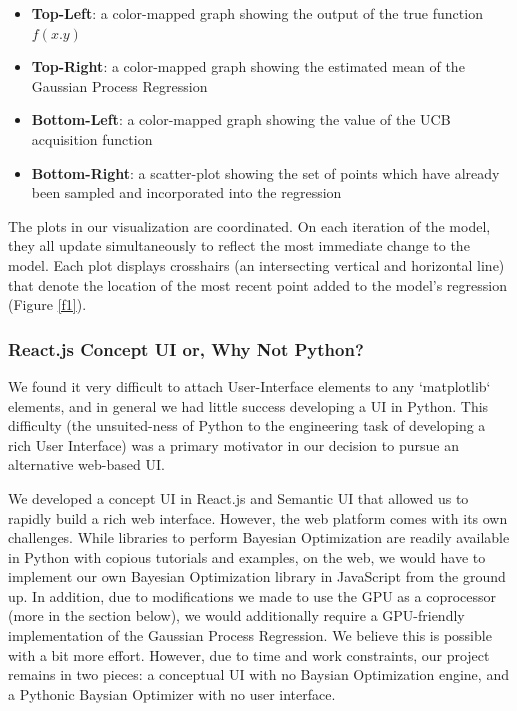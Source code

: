 \documentclass{vgtc}                          %
\begin{document}
\begin{itemize}

	\item \textbf{Top-Left}: a color-mapped graph showing the output of the
		true function $f(x.y)$

	\item \textbf{Top-Right}: a color-mapped graph showing the estimated
		mean of the Gaussian Process Regression

	\item \textbf{Bottom-Left}: a color-mapped graph showing the value of
		the UCB acquisition function
	
	\item \textbf{Bottom-Right}: a scatter-plot showing the set of points
		which have already been sampled and incorporated into the
		regression

\end{itemize}

The plots in our visualization are coordinated. On each iteration of the model,
they all update simultaneously to reflect the most immediate change to the
model. Each plot displays crosshairs (an intersecting vertical and horizontal
line) that denote the location of the most recent point added to the model's
regression (Figure \ref{f1}).

\subsubsection{React.js Concept UI or, Why Not Python?}

We found it very difficult to attach User-Interface elements to any
`matplotlib` elements, and in general we had little success developing a UI in
Python. This difficulty (the unsuited-ness of Python to the engineering task
of developing a rich User Interface) was a primary motivator in our decision to
pursue an alternative web-based UI. 

We developed a concept UI in React.js and Semantic UI that allowed us to
rapidly build a rich web interface. However, the web platform comes with its
own challenges. While libraries to perform Bayesian Optimization are readily
available in Python with copious tutorials and examples, on the web, we would
have to implement our own Bayesian Optimization library in JavaScript from the
ground up. In addition, due to modifications we made to use the GPU as a
coprocessor (more in the section below), we would additionally require a
GPU-friendly implementation of the Gaussian Process Regression. We believe this
is possible with a bit more effort. However, due to time and work constraints,
our project remains in two pieces: a conceptual UI with no Baysian Optimization
engine, and a Pythonic Baysian Optimizer with no user interface.
\end{document}
